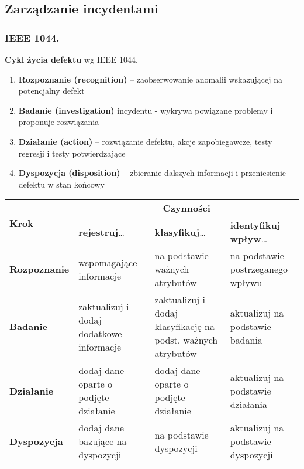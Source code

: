 \documentclass[../main.tex]{subfiles}
\begin{document}
    \subsection{Zarządzanie incydentami}

    \subsubsection{IEEE 1044.}
    \textbf{Cykl życia defektu} wg IEEE 1044.
    \begin{enumerate}
        \item \textbf{Rozpoznanie (recognition)} – zaobserwowanie anomalii wskazującej na potencjalny defekt
        \item \textbf{Badanie (investigation)} incydentu - wykrywa powiązane problemy i proponuje rozwiązania
        \item \textbf{Działanie (action)} – rozwiązanie defektu, akcje zapobiegawcze, testy regresji i testy potwierdzające
        \item \textbf{Dyspozycja (disposition)} – zbieranie dalszych informacji i przeniesienie defektu w stan końcowy
    \end{enumerate}

    \begin{table}[H]
        \begin{center}
            \begin{tabular}{ | p{3cm} | p{4cm} | p{4cm} | p{4cm} |}
                \hline
                \multirow{2}{*}{\textbf{Krok}} & \multicolumn{3}{c|}{\textbf{Czynności}} \\
                \cline{2-4}
                \multirow{2}{*}{} & \textbf{rejestruj}\ldots & \textbf{klasyfikuj}\ldots & \textbf{identyfikuj wpływ}\ldots \\
                \hline
                \textbf{Rozpoznanie } & wspomagające informacje
                & na podstawie ważnych atrybutów
                & na podstawie postrzeganego wpływu \\
                \hline
                \textbf{Badanie}
                & zaktualizuj i dodaj dodatkowe informacje
                & zaktualizuj i dodaj klasyfikację na podst. ważnych atrybutów
                & aktualizuj na podstawie badania \\
                \hline
                \textbf{Działanie}
                & dodaj dane oparte o podjęte działanie
                & dodaj dane oparte o podjęte działanie
                & aktualizuj na podstawie działania \\
                \hline
                \textbf{Dyspozycja}
                & dodaj dane bazujące na dyspozycji
                & na podstawie dyspozycji
                & aktualizuj na podstawie dyspozycji \\
                \hline
            \end{tabular}
        \end{center}
    \end{table}
\end{document}
